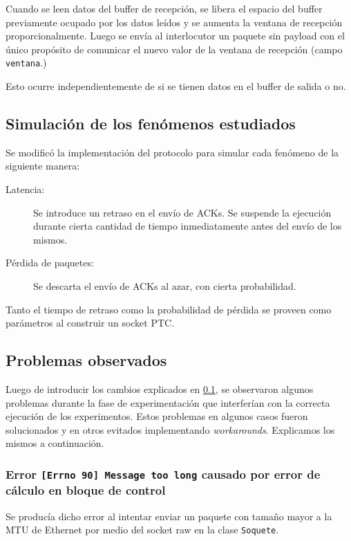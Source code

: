 \documentclass[a4paper, 10pt, twoside]{article}
\newcommand{\window}{\texttt{ventana}\xspace}
\begin{document}
Cuando se leen datos del buffer de recepción, se libera el espacio del buffer previamente ocupado por los datos leídos y se aumenta la ventana de recepción proporcionalmente. Luego se envía al interlocutor un paquete sin payload con el único propósito de comunicar el nuevo valor de la ventana de recepción (campo \window.)

Esto ocurre independientemente de si se tienen datos en el buffer de salida o no.


\subsection{Simulación de los fenómenos estudiados}
\label{sec:simulacion-fenomenos}

Se modificó la implementación del protocolo para simular cada fenómeno de la siguiente manera:

\begin{description}
  \item[Latencia:] Se introduce un retraso en el envío de ACKs. Se suspende la ejecución durante cierta cantidad de tiempo inmediatamente antes del envío de los mismos.

  \item[Pérdida de paquetes:] Se descarta el envío de ACKs al azar, con cierta probabilidad.
\end{description}

Tanto el tiempo de retraso como la probabilidad de pérdida se proveen como parámetros al construir un socket PTC.


\subsection{Problemas observados}
\label{sec:problemas-observados}

Luego de introducir los cambios explicados en \ref{sec:simulacion-fenomenos}, se observaron algunos problemas durante la fase de experimentación que interferían con la correcta ejecución de los experimentos. Estos problemas en algunos casos fueron solucionados y en otros evitados implementando \emph{workarounds}. Explicamos los mismos a continuación.


\subsubsection{Error \texttt{[Errno 90] Message too long} causado por error de cálculo en bloque de control}

Se producía dicho error al intentar enviar un paquete con tamaño mayor a la MTU de Ethernet por medio del socket raw en la clase \texttt{Soquete}.
\end{document}
